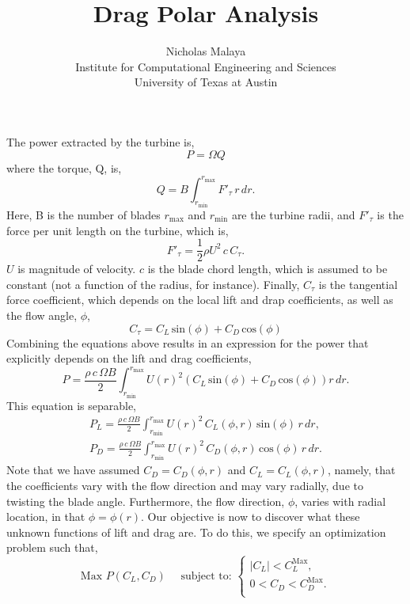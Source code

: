 \documentclass{article}
\title{\bf{Drag Polar Analysis}}
\author{Nicholas Malaya \\ Institute for Computational Engineering and Sciences \\ University of Texas at Austin} \date{}
\begin{document}
\maketitle

\newpage

The power extracted by the turbine is, 
\begin{equation}
 P = \Omega Q
\end{equation}
where the torque, Q, is, 
\begin{equation}
 Q = B \int_{r_{\text{min}}}^{r_{\text{max}}} F'_{\tau}\, r\, dr.
\end{equation}
Here, B is the number of blades $r_{\text{max}}$ and $r_{\text{min}}$
are the turbine radii, and $F'_{\tau}$ is the force per unit
length on the turbine, which is, 
\begin{equation}
 F'_{\tau} = \frac{1}{2}\rho U^2 \, c \, C_{\tau}.
\end{equation}
$U$ is magnitude of velocity. $c$ is the blade chord
length, which is assumed to be constant (not a function of the radius,
for instance). Finally, $C_{\tau}$ is the tangential force coefficient,
which depends on the local lift and drap coefficients, as well as the
flow angle, $\phi$, 
\begin{equation}
 C_{\tau} = C_L \,\text{sin}(\phi) + C_D \,\text{cos}(\phi)
\end{equation}
Combining the equations above results in an expression for the power
that explicitly depends on the lift and drag coefficients, 
\begin{equation*}
 P = \frac{\rho\, c\, \Omega B}{2}
  \int_{r_{\text{min}}}^{r_{\text{max}}} U(r)^2 \left(C_L
						     \,\text{sin}(\phi)
						     + C_D
						     \,\text{cos}(\phi)
						    \right) r\,dr. 
\end{equation*}
This equation is separable, 
\begin{align}
 P_L = \frac{\rho\, c\, \Omega B}{2}
  \int_{r_{\text{min}}}^{r_{\text{max}}} U(r)^2 \, C_L(\phi,r)
 \,\text{sin}(\phi)\, r\,dr,  \label{lift} \\
 P_D = \frac{\rho\, c\, \Omega B}{2}
  \int_{r_{\text{min}}}^{r_{\text{max}}} U(r)^2 \, C_D(\phi,r) \,\text{cos}(\phi)\, r\,dr. \label{drag}
\end{align}
Note that we have assumed $C_D = C_D(\phi,r)$ and $C_L = C_L(\phi,r)$,
namely, that the coefficients vary with the flow direction and may vary
radially, due to twisting the blade angle. Furthermore, the flow
direction, $\phi$, varies with radial location, in that $\phi=\phi(r)$. 
Our objective is now to discover what these unknown functions of lift
and drag are. To do this, we specify an optimization problem such that, 
\begin{equation*} 
 \text{Max } P(C_L,C_D) \quad \text{ subject to: }
  \begin{cases}
   |C_L| < C_L^{\text{Max}}, \\
   0 < C_D < C_D^{\text{Max}}. \\
  \end{cases}
\end{equation*}
\end{document}
